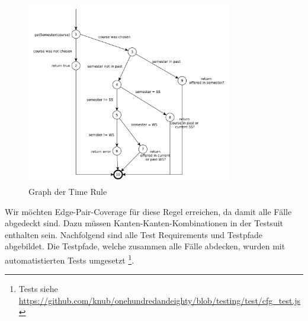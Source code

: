 \documentclass[ngerman]{article}
\begin{document}
\begin{figure}[h!]
\includegraphics[width=0.8\textwidth]{figures/time_rule.pdf}
\caption{Graph der Time Rule}
\label{Fig:graph_time_rule}
\end{figure}

Wir möchten Edge-Pair-Coverage für diese Regel erreichen, da damit alle Fälle abgedeckt sind. 
Dazu müssen Kanten-Kanten-Kombinationen in der Testsuit enthalten sein.
Nachfolgend sind alle Test Requirements und Testpfade abgebildet. Die Testpfade, welche zusammen alle Fälle abdecken, wurden mit automatistierten Tests umgesetzt \footnote{Tests siehe \url{https://github.com/knub/onehundredandeighty/blob/testing/test/cfg_test.js}}.


\vspace{1em}
\end{document}
